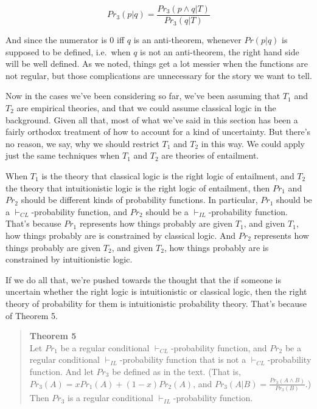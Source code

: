 \documentclass[
  11pt,
  letterpaper,
  DIV=11,
  numbers=noendperiod,
  oneside]{scrartcl}
\begin{document}
\[
Pr_3(p | q) = \frac{Pr_3(p \wedge q | T)}{Pr_3(q | T)}
\]

And since the numerator is 0 iff \(q\) is an anti-theorem, whenever
\(Pr(p | q)\) is supposed to be defined, i.e.~when \(q\) is not an
anti-theorem, the right hand side will be well defined. As we noted,
things get a lot messier when the functions are not regular, but those
complications are unnecessary for the story we want to tell.

Now in the cases we've been considering so far, we've been assuming that
\(T_1\) and \(T_2\) are empirical theories, and that we could assume
classical logic in the background. Given all that, most of what we've
said in this section has been a fairly orthodox treatment of how to
account for a kind of uncertainty. But there's no reason, we say, why we
should restrict \(T_1\) and \(T_2\) in this way. We could apply just the
same techniques when \(T_1\) and \(T_2\) are theories of entailment.

When \(T_1\) is the theory that classical logic is the right logic of
entailment, and \(T_2\) the theory that intuitionistic logic is the
right logic of entailment, then \(Pr_1\) and \(Pr_2\) should be
different kinds of probability functions. In particular, \(Pr_1\) should
be a \(\vdash_{CL}\)-probability function, and \(Pr_2\) should be a
\(\vdash_{IL}\)-probability function. That's because \(Pr_1\) represents
how things probably are given \(T_1\), and given \(T_1\), how things
probably are is constrained by classical logic. And \(Pr_2\) represents
how things probably are given \(T_2\), and given \(T_2\), how things
probably are is constrained by intuitionistic logic.

If we do all that, we're pushed towards the thought that the if someone
is uncertain whether the right logic is intuitionistic or classical
logic, then the right theory of probability for them is intuitionistic
probability theory. That's because of Theorem 5.

\begin{quote}
\textbf{Theorem 5}\\
Let \(Pr_1\) be a regular conditional \(\vdash_{CL}\)-probability
function, and \(Pr_2\) be a regular conditional
\(\vdash_{IL}\)-probability function that is not a
\(\vdash_{CL}\)-probability function. And let \(Pr_3\) be defined as in
the text. (That is, \(Pr_3(A) = xPr_1(A) + (1-x)Pr_2(A)\), and
\(Pr_3(A | B) = \frac{Pr_3(A \wedge B)}{Pr_3(B)}\).) Then \(Pr_3\) is a
regular conditional \(\vdash_{IL}\)-probability function.
\end{quote}
\end{document}
